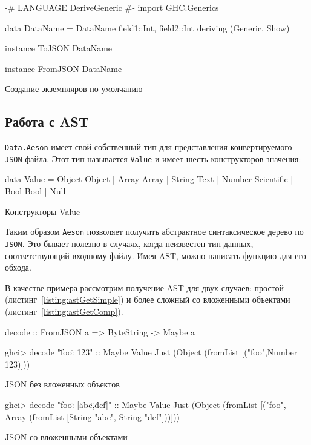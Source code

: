 \begin{ListingEnv}[H]
\begin{Verb}
{-# LANGUAGE DeriveGeneric #-}
import GHC.Generics

data DataName = DataName {
        field1::Int,
        field2::Int
     } deriving (Generic, Show)

instance ToJSON DataName

instance FromJSON DataName
\end{Verb}
\caption{Создание экземпляров по умолчанию}
\label{listing:genericData}
\end{ListingEnv}

\subsection{Работа с AST}

\lstinline{Data.Aeson} имеет свой собственный тип для представления конвертируемого \lstinline{JSON}-файла. Этот тип называется \lstinline{Value} и имеет шесть конструкторов значения:

\begin{ListingEnv}[H]
\begin{Verb}
data Value
  = Object Object
  | Array Array
  | String Text
  | Number Scientific
  | Bool Bool
  | Null
\end{Verb}
\caption{Конструкторы Value}
\label{listing:value}
\end{ListingEnv}

Таким образом \lstinline{Aeson} позволяет получить абстрактное синтаксическое дерево по \lstinline{JSON}. Это бывает полезно в случаях, когда неизвестен тип данных, соответствующий входному файлу. Имея AST, можно написать функцию для его обхода.~\cite{aesonEx}

В качестве примера рассмотрим получение AST для двух случаев: простой (листинг~\ref{listing:astGetSimple}) и более сложный со вложенными объектами (листинг~\ref{listing:astGetComp}).

\begin{ListingEnv}[H]
\begin{Verb}
decode :: FromJSON a => ByteString -> Maybe a

ghci> decode "{\"foo\": 123}" :: Maybe Value
Just (Object (fromList [("foo",Number 123)]))
\end{Verb}
\caption{JSON без вложенных объектов}
\label{listing:astGetSimple}
\end{ListingEnv}

\begin{ListingEnv}[H]
\begin{Verb}
ghci> decode "{\"foo\": [\"abc\",\"def\"]}" :: Maybe Value
Just (Object (fromList [("foo", Array (fromList [String "abc", 
                                               String "def"]))]))
\end{Verb}
\caption{JSON со вложенными объектами}
\label{listing:astGetComp}
\end{ListingEnv}

